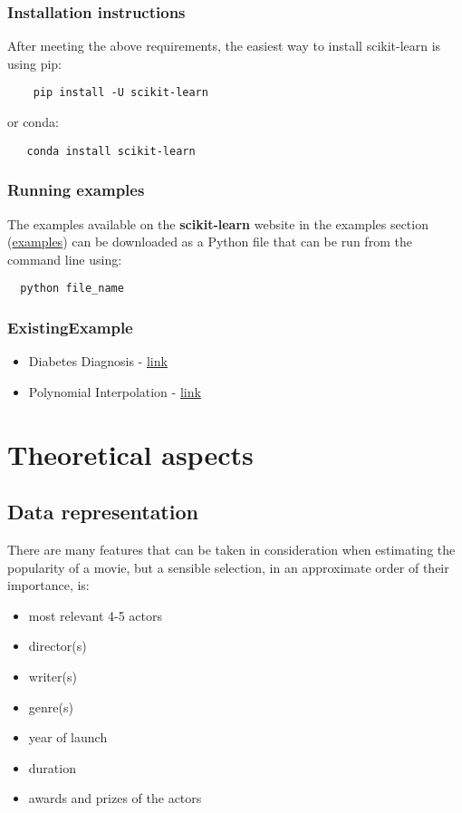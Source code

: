 \documentclass[a4paper,10pt]{article}
\begin{document}
\subsubsection{Installation instructions}
After meeting the above requirements, the easiest way to install scikit-learn is using pip:
\begin{verbatim}
    pip install -U scikit-learn
\end{verbatim}
or conda:
\begin{verbatim}
   conda install scikit-learn
\end{verbatim}
\subsubsection{Running examples}
The examples available on the \textbf{scikit-learn} website in the examples section (\href{http://scikit-learn.org/stable/auto_examples/index.html}{examples}) can be downloaded as a Python file that can be run from the command line using:
\begin{verbatim}
  python file_name
\end{verbatim}
  
\subsubsection{ExistingExample}
\begin{itemize}
	\item Diabetes Diagnosis - \href{http://scikit-learn.org/stable/auto_examples/linear_model/plot_ols.html#sphx-glr-auto-examples-linear-model-plot-ols-py}{link}\\
	\item Polynomial Interpolation - \href{http://scikit-learn.org/stable/auto_examples/linear_model/plot_polynomial_interpolation.html#sphx-glr-auto-examples-linear-model-plot-polynomial-interpolation-py}{link}\\
\end{itemize}

\section{Theoretical aspects}

\subsection{Data representation}
There are many features that can be taken in consideration when estimating the popularity of a movie, but a sensible selection, in an approximate order of their importance, is:
\begin{itemize}
	\item most relevant 4-5 actors
	\item director(s)
	\item writer(s)
	\item genre(s)
	\item year of launch
	\item duration
	\item awards and prizes of the actors
\end{itemize}
   
\end{document}
